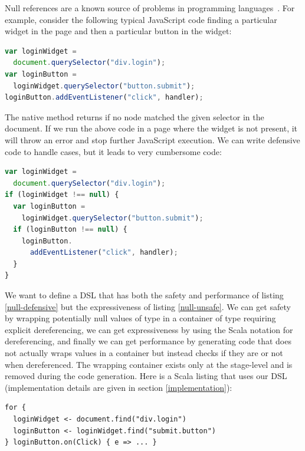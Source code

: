 \documentclass[preprint]{sigplanconf}
\begin{document}
Null references are a known source of problems in programming languages~\cite{Hoare09_Null,Nanda09_Null}. For
example, consider the following typical JavaScript code finding a particular widget in the page and then a particular
button in the widget:

\begin{lstlisting}[language=JavaScript,label=null-unsafe,caption=Unsafe code]
var loginWidget =
  document.querySelector("div.login");
var loginButton =
  loginWidget.querySelector("button.submit");
loginButton.addEventListener("click", handler);
\end{lstlisting}

The native  method returns  if no node matched the given selector in the document. If
we run the above code in a page where the widget is not present, it will throw an error and stop further JavaScript
execution. We can write defensive code to handle  cases, but it leads to very cumbersome code:

\begin{lstlisting}[language=JavaScript,label=null-defensive,caption=Defensive programming to handle null references]
var loginWidget =
  document.querySelector("div.login");
if (loginWidget !== null) {
  var loginButton =
    loginWidget.querySelector("button.submit");
  if (loginButton !== null) {
    loginButton.
      addEventListener("click", handler);
  }
}
\end{lstlisting}

We want to define a DSL that has both the safety and performance of listing \ref{null-defensive} but the
expressiveness of listing \ref{null-unsafe}. We can get safety by wrapping potentially null values of type
 in a container of type  requiring explicit dereferencing, we can get
expressiveness by using the Scala  notation for dereferencing, and finally we can get performance by
generating code that does not actually wraps values in a container but instead checks if they are  or not
when dereferenced. The wrapping container exists only at the stage-level and is removed during the code generation.
Here is a Scala listing that uses our DSL (implementation details are given in section \ref{implementation}):

\begin{lstlisting}
for {
  loginWidget <- document.find("div.login")
  loginButton <- loginWidget.find("submit.button")
} loginButton.on(Click) { e => ... }
\end{lstlisting}
\end{document}
